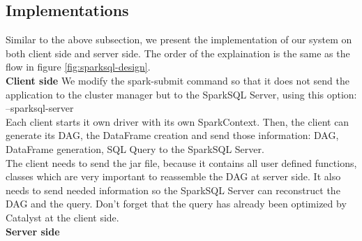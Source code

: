 \subsection{Implementations}
Similar to the above subsection, we present the implementation of our system on both client side and server side. The order of the explaination is the same as the flow in figure \ref{fig:sparksql-design}.\\
\textbf{Client side} We modify the spark-submit command so that it does not send the application to the cluster manager but to the SparkSQL Server, using this option:  --sparksql-server\\
Each client starts it own driver with its own SparkContext. Then, the client can generate its DAG, the DataFrame creation and send those information: DAG, DataFrame generation, SQL Query to the SparkSQL Server.\\
The client needs to send the jar file, because it contains all user defined functions, classes which are very important to reassemble the DAG at server side. It also needs to send needed information so the SparkSQL Server can reconstruct the DAG and the query. Don’t forget that the query has already been optimized by Catalyst at the client side.\\
\textbf{Server side}
